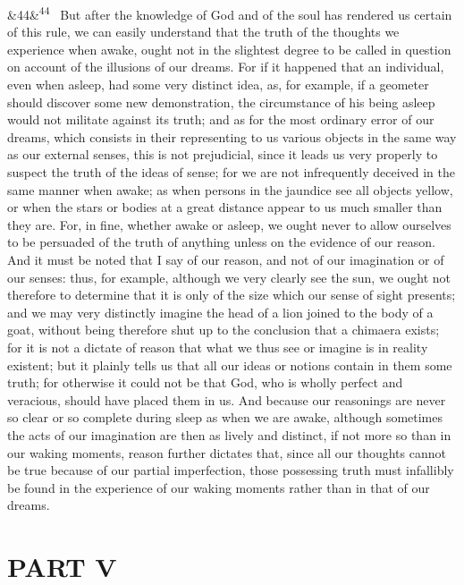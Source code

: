 \documentclass[12pt]{article}
\newcommand{\para}[1][]{\par\noindent\ifx&#1&\else\textsuperscript{\footnotesize #1}~\fi}
\begin{document}
\para[44] But after the knowledge of God and of the soul has rendered us certain of this rule, we can easily understand that the truth of the thoughts we experience when awake, ought not in the slightest degree to be called in question on account of the illusions of our dreams. For if it happened that an individual, even when asleep, had some very distinct idea, as, for example, if a geometer should discover some new demonstration, the circumstance of his being asleep would not militate against its truth; and as for the most ordinary error of our dreams, which consists in their representing to us various objects in the same way as our external senses, this is not prejudicial, since it leads us very properly to suspect the truth of the ideas of sense; for we are not infrequently deceived in the same manner when awake; as when persons in the jaundice see all objects yellow, or when the stars or bodies at a great distance appear to us much smaller than they are. For, in fine, whether awake or asleep, we ought never to allow ourselves to be persuaded of the truth of anything unless on the evidence of our reason. And it must be noted that I say of our reason, and not of our imagination or of our senses: thus, for example, although we very clearly see the sun, we ought not therefore to determine that it is only of the size which our sense of sight presents; and we may very distinctly imagine the head of a lion joined to the body of a goat, without being therefore shut up to the conclusion that a chimaera exists; for it is not a dictate of reason that what we thus see or imagine is in reality existent; but it plainly tells us that all our ideas or notions contain in them some truth; for otherwise it could not be that God, who is wholly perfect and veracious, should have placed them in us. And because our reasonings are never so clear or so complete during sleep as when we are awake, although sometimes the acts of our imagination are then as lively and distinct, if not more so than in our waking moments, reason further dictates that, since all our thoughts cannot be true because of our partial imperfection, those possessing truth must infallibly be found in the experience of our waking moments rather than in that of our dreams.

\section*{PART V}
\end{document}
